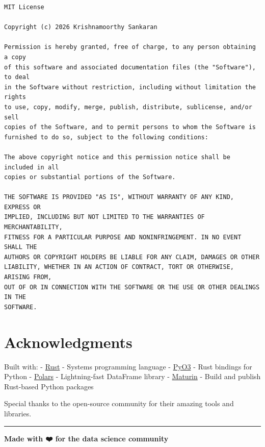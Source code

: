 \documentclass[
  letterpaper,
]{scrbook}
\begin{document}
\begin{verbatim}
MIT License

Copyright (c) 2026 Krishnamoorthy Sankaran

Permission is hereby granted, free of charge, to any person obtaining a copy
of this software and associated documentation files (the "Software"), to deal
in the Software without restriction, including without limitation the rights
to use, copy, modify, merge, publish, distribute, sublicense, and/or sell
copies of the Software, and to permit persons to whom the Software is
furnished to do so, subject to the following conditions:

The above copyright notice and this permission notice shall be included in all
copies or substantial portions of the Software.

THE SOFTWARE IS PROVIDED "AS IS", WITHOUT WARRANTY OF ANY KIND, EXPRESS OR
IMPLIED, INCLUDING BUT NOT LIMITED TO THE WARRANTIES OF MERCHANTABILITY,
FITNESS FOR A PARTICULAR PURPOSE AND NONINFRINGEMENT. IN NO EVENT SHALL THE
AUTHORS OR COPYRIGHT HOLDERS BE LIABLE FOR ANY CLAIM, DAMAGES OR OTHER
LIABILITY, WHETHER IN AN ACTION OF CONTRACT, TORT OR OTHERWISE, ARISING FROM,
OUT OF OR IN CONNECTION WITH THE SOFTWARE OR THE USE OR OTHER DEALINGS IN THE
SOFTWARE.
\end{verbatim}

\section*{Acknowledgments}\label{acknowledgments}


Built with: - \href{https://www.rust-lang.org/}{Rust} - Systems
programming language - \href{https://pyo3.rs/}{PyO3} - Rust bindings for
Python - \href{https://www.pola.rs/}{Polars} - Lightning-fast DataFrame
library - \href{https://github.com/PyO3/maturin}{Maturin} - Build and
publish Rust-based Python packages

Special thanks to the open-source community for their amazing tools and
libraries.

\begin{center}\rule{0.5\linewidth}{0.5pt}\end{center}

\textbf{Made with ❤️ for the data science community}


\backmatter
\end{document}
